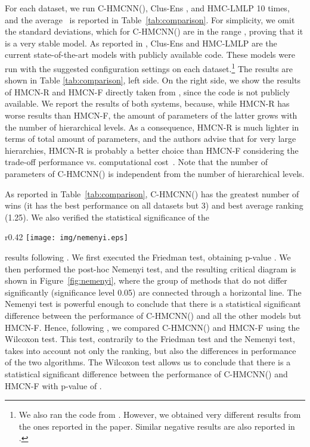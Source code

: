 \documentclass{article}
\newcommand{\system}[1]{C-HMCNN(#1)}
\newcommand{\lmlp}{{HMC-LMLP}}
\newcommand{\ens}{{Clus-Ens}}
\newcommand{\hmcnf}{{HMCN-F}}
\newcommand{\hmcnr}{{HMCN-R}}
\newcommand{\auprc}{}
\begin{document}
For each dataset, we run \system{}, {\ens} \citep{schietgat2010}, and {\lmlp} \citep{cerri2016} 10 times, and the average \auprc~is reported in Table~\ref{tab:comparison}. For simplicity, we omit the standard deviations, which for \system{} are in the range ,  proving that it is  a very stable model. As reported in \citep{nakano2019}, {\ens} and {\lmlp} are the current state-of-the-art models with publicly available code. These models were run with the suggested configuration settings on each dataset.\footnote{We also ran the code from \citep{masera2018}. However, we obtained very different results from the ones reported in the paper. 
Similar negative results are also reported in \citep{nakano2019}.}
The results are shown in Table \ref{tab:comparison}, left side. On the right side, we show the results of {\hmcnr} and {\hmcnf} directly taken from \citep{cerri2018}, since the code is not publicly available. We report the results of both systems, because, while {\hmcnr} has worse results than {\hmcnf}, the amount of parameters of the latter grows with the number of hierarchical levels. As a consequence,   {\hmcnr} is much lighter in terms of total amount of parameters, and the authors advise that for very large hierarchies, {\hmcnr} is probably a better choice than {\hmcnf} considering the trade-off performance vs. computational cost~\cite{cerri2018}. Note that the number of parameters of \system{} is independent from the number of hierarchical levels.

  As reported in Table~\ref{tab:comparison}, \system{} has the greatest number of wins (it has the best performance on all datasets but 3) and best average ranking (1.25). We also verified the statistical significance of the
  \begin{wrapfigure}{r}{0.42\textwidth}
    \centering
    \vspace{-.12cm}
    \texttt{[image: img/nemenyi.eps]}
    \caption{Critical diagram for the Nemenyi's statistical test.\label{fig:nemenyi}}
    \vspace{-.2cm}
\end{wrapfigure}
   results following \cite{demsar2006}. We first executed the Friedman test, obtaining p-value .
  We then performed the post-hoc Nemenyi
   test, and the resulting critical diagram is shown in Figure~\ref{fig:nemenyi}, where the group of methods that do not differ significantly (significance level 0.05) are connected through a horizontal line. The Nemenyi test is powerful enough to conclude that there is a statistical significant difference between the performance of \system{} and all the other models but \hmcnf. Hence, following \citep{demsar2006,benavoli2016}, we compared \system{} and {\hmcnf} using the Wilcoxon test. This test, contrarily to the Friedman test and the Nemenyi test, takes into account not only the ranking, but also the differences in performance of the two algorithms.  
 The Wilcoxon test allows us to conclude that there is a statistical significant difference between the  performance of \system{} and {\hmcnf} with p-value of . 
\end{document}
